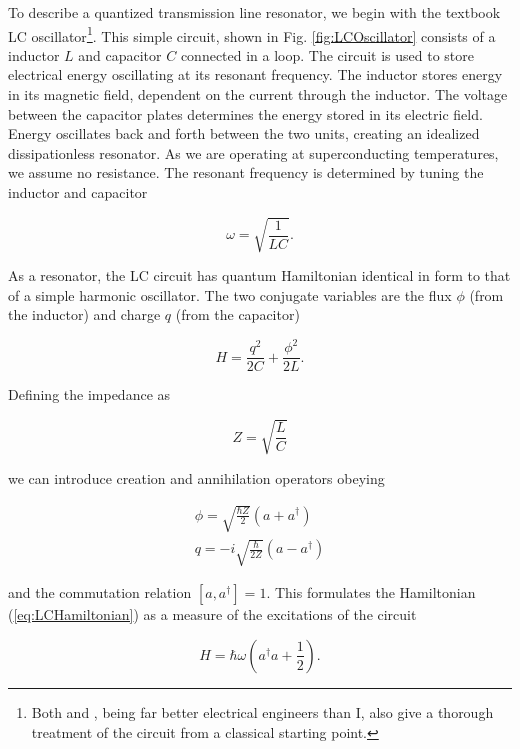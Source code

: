 \documentclass[11 pt, oneside]{book} %
\begin{document}
To describe a quantized transmission line resonator, we begin with the textbook LC oscillator\footnote{Both \cite{Bishop} and \cite{Schuster}, being far better electrical engineers than I, also give a thorough treatment of the circuit from a classical starting point.}. This simple circuit, shown in Fig. \ref{fig:LCOscillator} consists of a inductor $L$ and capacitor $C$ connected in a loop. The circuit is used to store electrical energy oscillating at its resonant frequency. The inductor stores energy in its magnetic field, dependent on the current through the inductor. The voltage between the capacitor plates determines the energy stored in its electric field. Energy oscillates back and forth between the two units, creating an idealized dissipationless resonator. As we are operating at superconducting temperatures, we assume no resistance. The resonant frequency is determined by tuning the inductor and capacitor

\begin{equation}
\omega = \sqrt{\frac{1}{LC}}.
\end{equation}

As a resonator, the LC circuit has quantum Hamiltonian identical in form to that of a simple harmonic oscillator. The two conjugate variables are the flux $\phi$ (from the inductor) and charge $q$ (from the capacitor)

\begin{equation}\label{eq:LCHamiltonian}
H=\frac{q^2}{2C}+\frac{\phi^2}{2L}.
\end{equation}

Defining the impedance as

\begin{equation}
Z=\sqrt{\frac{L}{C}}
\end{equation}

we can introduce creation and annihilation operators obeying 

\begin{eqnarray}
\phi=\sqrt{\frac{\hbar Z}{2}}\left(a+a^\dag\right) \\
q=-i\sqrt{\frac{\hbar}{2Z}}\left(a-a^\dag\right)
\end{eqnarray}

and the commutation relation $[a,a^\dag]=1$. This formulates the Hamiltonian (\ref{eq:LCHamiltonian}) as a measure of the excitations of the circuit

\begin{equation}\label{eq:SHO}
H=\hbar \omega\left(a^\dag a + \frac{1}{2}\right).
\end{equation}
\end{document}
